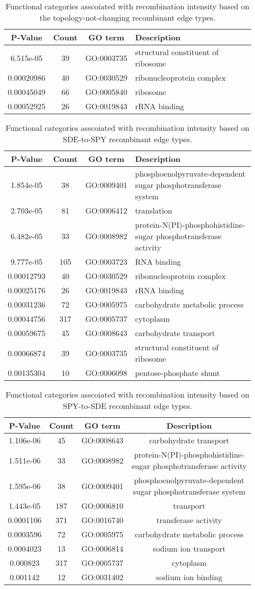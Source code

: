 \documentclass[english]{article}
\providecommand{\tabularnewline}{\\}
\begin{document}
%
\begin{table}
\caption{\label{tab:functional-notopology}Functional categories asscoiated with 
recombination intensity based on the topology-not-changing recombinant edge types.}
\begin{tabular}{cccl}
\hline 
P-Value & Count & GO term & Description\tabularnewline
\hline 
6.515e-05 & 39 & GO:0003735 & structural constituent of ribosome\tabularnewline
0.00020986 & 40 & GO:0030529 & ribonucleoprotein complex\tabularnewline
0.00045049 & 66 & GO:0005840 & ribosome\tabularnewline
0.00052925 & 26 & GO:0019843 & rRNA binding\tabularnewline
\hline 
\end{tabular}
\end{table}
\clearpage{}

\begin{table}
\caption{\label{tab:functional-sde-spy}Functional categories asscoiated with 
recombination intensity based on SDE-to-SPY recombinant edge types.}
\begin{tabular}{cccl}
\hline 
P-Value & Count & GO term & Description\tabularnewline
\hline 
1.854e-05 & 38 & GO:0009401 & phosphoenolpyruvate-dependent sugar phosphotransferase system\tabularnewline
2.703e-05 & 81 & GO:0006412 & translation\tabularnewline
6.482e-05 & 33 & GO:0008982 & protein-N(PI)-phosphohistidine-sugar phosphotransferase activity\tabularnewline
9.777e-05 & 105 & GO:0003723 & RNA binding\tabularnewline
0.00012793 & 40 & GO:0030529 & ribonucleoprotein complex\tabularnewline
0.00025176 & 26 & GO:0019843 & rRNA binding\tabularnewline
0.00031236 & 72 & GO:0005975 & carbohydrate metabolic process\tabularnewline
0.00044756 & 317 & GO:0005737 & cytoplasm\tabularnewline
0.00059675 & 45 & GO:0008643 & carbohydrate transport\tabularnewline
0.00066874 & 39 & GO:0003735 & structural constituent of ribosome\tabularnewline
0.00135304 & 10 & GO:0006098 & pentose-phosphate shunt\tabularnewline
\hline 
\end{tabular}
\end{table}
\clearpage{}

\begin{table}
\caption{\label{tab:functional-spy-sde}Functional categories asscoiated with 
recombination intensity based on SPY-to-SDE recombinant edge types.}
\begin{tabular}{cccc}
\hline 
P-Value & Count & GO term & Description\tabularnewline
\hline 
1.106e-06 & 45 & GO:0008643 & carbohydrate transport\tabularnewline
1.511e-06 & 33 & GO:0008982 & protein-N(PI)-phosphohistidine-sugar phosphotransferase activity\tabularnewline
1.595e-06 & 38 & GO:0009401 & phosphoenolpyruvate-dependent sugar phosphotransferase system\tabularnewline
1.443e-05 & 187 & GO:0006810 & transport\tabularnewline
0.0001106 & 371 & GO:0016740 & transferase activity\tabularnewline
0.0003596 & 72 & GO:0005975 & carbohydrate metabolic process\tabularnewline
0.0004023 & 13 & GO:0006814 & sodium ion transport\tabularnewline
0.000823 & 317 & GO:0005737 & cytoplasm\tabularnewline
0.001142 & 12 & GO:0031402 & sodium ion binding\tabularnewline
\hline 
\end{tabular}
\end{table}
\clearpage{}
\end{document}
